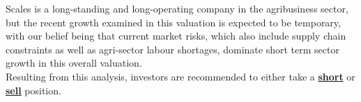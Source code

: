 \documentclass{article}
\begin{document}
Scales is a long-standing and long-operating company in the agribusiness sector, but the recent growth examined in this valuation is expected to be temporary, with our belief being that current market risks, which also include supply chain constraints as well as agri-sector labour shortages, dominate short term sector growth in this overall valuation. \\

Resulting from this analysis, investors are recommended to either take a \underline{\textbf{short}} or \underline{\textbf{sell}} position.



\newpage


\end{document}
